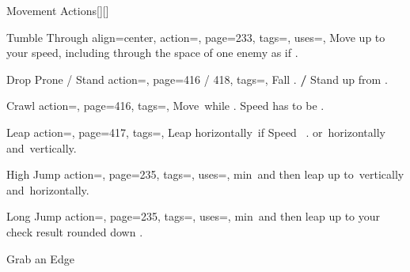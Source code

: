 \begin{PageBackLandscape}
\begin{TablesHalf}{\backTableHeight}
\begin{Table}{Movement Actions}[][]
\begin{entry}{Tumble Through}{%
                align=center,
                action=,
                page=233,
                tags=\Move,
                uses=\AcrobaticsReflex,
            }
                Move up to your speed, including through the space of one enemy as if .\\
                \phant
            \end{entry}
            \breakLine
            \begin{entry}{Drop Prone / Stand}{%
                action=,
                page=416 / 418,
                tags=\Move,
            }
                Fall \Prone. \textbf{/} Stand up from \Prone.
            \end{entry}
            \begin{entry}{Crawl}{%
                action=,
                page=416,
                tags=\Move,
            }
                Move \,\Feet while \Prone. Speed has to be .
            \end{entry}
            \breakLine
            \begin{entry}{Leap}{%
                action=,
                page=417,
                tags=\Move,
            }
                Leap horizontally
                \,\Feet if Speed \,\Feet
                .\hfill
                or \,\Feet horizontally and \,\Feet vertically.
            \end{entry}
            \begin{entry}{High Jump}{%
                action=,
                page=235,
                tags=\Move,
                uses={\Athletics[][val=30]},
            }
                 min \,\Feet and then leap up to \,\Feet vertically
                and \,\Feet horizontally.\hfill
            \end{entry}
            \begin{entry}{Long Jump}{%
                action=,
                page=235,
                tags=\Move,
                uses={\Athletics[][val=15]},
            }
                 min \,\Feet and then leap up to your check result rounded down .
                \hfill
                \; 
            \end{entry}
            \begin{entry}{Grab an Edge}{%
}
\end{entry}
\end{Table}
\end{TablesHalf}
\end{PageBackLandscape}

